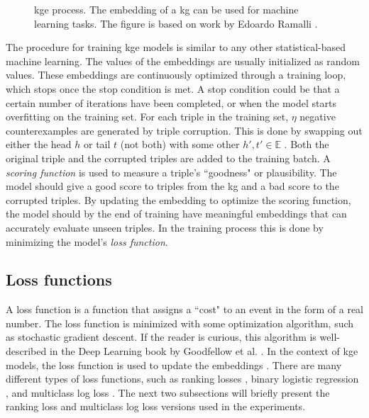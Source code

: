 \begin{figure}[htp]
    \centering
    
    \caption[KGE process.]{\gls{kge} process. The embedding of a \gls{kg} can be used for machine learning tasks. The figure is based on work by Edoardo Ramalli \cite{wiki_KG_embedding}.}
    \label{KG_embdding_diag}
\end{figure}

The procedure for training \gls{kge} models is similar to any other statistical-based machine learning. The values of the embeddings are usually initialized as random values. These embeddings are continuously optimized through a training loop, which stops once the stop condition is met. A stop condition could be that a certain number of iterations have been completed, or when the model starts overfitting on the training set. For each triple in the training set, $\eta$ negative counterexamples are generated by triple corruption. This is done by swapping out either the head $h$ or tail $t$ (not both) with some other $h', t' \in \mathbb{E}$ \cite{TransE}. Both the original triple and the corrupted triples are added to the training batch. A \textit{scoring function} is used to measure a triple's ``goodness" or plausibility. The model should give a good score to triples from the \gls{kg} and a bad score to the corrupted triples. By updating the embedding to optimize the scoring function, the model should by the end of training have meaningful embeddings that can accurately evaluate unseen triples. In the training process this is done by minimizing the model's \textit{loss function}.

\subsection{Loss functions}
A loss function is a function that assigns a ``cost" to an event in the form of a real number. The loss function is minimized with some optimization algorithm, such as stochastic gradient descent. If the reader is curious, this algorithm is well-described in the Deep Learning book by Goodfellow et al. \cite[p. 149]{goodfellow}. In the context of \gls{kge} models, the loss function is used to update the embeddings \cite{dai2020survey}. There are many different types of loss functions, such as ranking losses \cite{TransE}, binary logistic regression \cite{complEx}, and multiclass log loss \cite{kadlec2017knowledge}. The next two subsections will briefly present the ranking loss and multiclass log loss versions used in the experiments.

